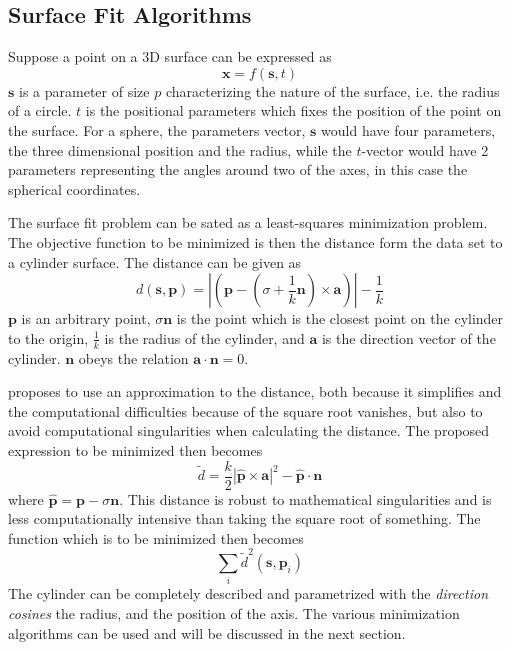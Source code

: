 \subsection{Surface Fit Algorithms}
\label{chap2:sec-surface-fit-alg}
Suppose a point on a 3D surface can be expressed as
\begin{equation}
    \mathbf{x} = f(\mathbf{s}, t)
\end{equation}
$\mathbf{s}$ is a parameter of size $p$ characterizing the nature of the surface, i.e. the
radius of a circle. $t$ is the positional parameters which fixes the position of the point
on the surface. For a sphere, the parameters vector, $\mathbf{s}$ would have four parameters,
the three dimensional position and the radius, while the $t$-vector would have 2
parameters representing the angles around two of the axes, in this case the spherical
coordinates.

The surface fit problem can be sated as a least-squares minimization problem. The
objective function to be minimized is then the distance form the data set to a cylinder
surface. The distance can be given as 
\begin{equation}
    d( \mathbf{s}, \mathbf{p})  = | ( \mathbf{p} - (\sigma + \frac{1}{k} \mathbf{n})
    \times \mathbf{a})| - \frac{1}{k}
\end{equation}
$\mathbf{p}$ is an arbitrary point, $\sigma \mathbf{n}$ is the point which is the closest
point on the cylinder to the origin, $\frac{1}{k}$ is the radius of the cylinder, and $\mathbf{a}$ is the
direction vector of the cylinder. $\mathbf{n}$ obeys the relation $\mathbf{a} \cdot
\mathbf{n} = 0$. 

\cite{ls-fit-cylinder} proposes to use an approximation to the distance, both because it
simplifies and the computational difficulties because of the square root vanishes, but
also to avoid computational singularities when calculating the distance. The proposed
expression to be minimized then becomes
\begin{equation}
    \tilde{d} = \frac{k}{2} |\hat{\mathbf{p}} \times \mathbf{a} | ^2 - \hat{\mathbf{p}} \cdot
    \mathbf{n}
\end{equation}
where $\hat{\mathbf{p}} = \mathbf{p} - \sigma \mathbf{n}$. This distance is robust to
mathematical singularities and is less computationally intensive than taking the square
root of something. The function which is to be minimized then becomes
\begin{equation}
    \label{chap2:eq-ls-cylinder-min}
    \sum_i \tilde{d}^2(\mathbf{s}, \mathbf{p}_i)
\end{equation}
The cylinder can be completely described and parametrized with the \emph{direction cosines} the radius, and
the position of the axis. The various minimization algorithms can be used and will be
discussed in the next section.


